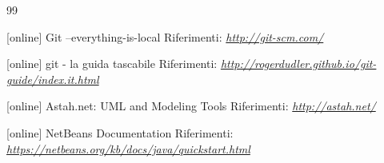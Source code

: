\begin {frame} [allowframebreaks]
\begin {thebibliography}{99}
{     [online]
      Git --everything-is-local  
     \newblock Riferimenti: \emph{\url{http://git-scm.com/ }}

     [online]
      git - la guida tascabile 
     \newblock Riferimenti: \emph{\url{http://rogerdudler.github.io/git-guide/index.it.html }}

     [online]
      Astah.net: UML and Modeling Tools
     \newblock Riferimenti: \emph{\url{http://astah.net/ }}

     [online]
      NetBeans Documentation
     \newblock Riferimenti: \emph{\url{https://netbeans.org/kb/docs/java/quickstart.html }}

   }
   \end {thebibliography}
\end{frame}
